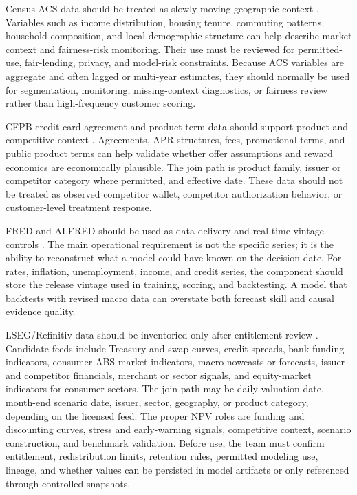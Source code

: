 \documentclass[11pt]{article}
\newcommand{\1}{\mathbf{1}}
\begin{document}
Census ACS data should be treated as slowly moving geographic context
\citep{censusACS}. Variables such as income distribution, housing tenure,
commuting patterns, household composition, and local demographic structure can
help describe market context and fairness-risk monitoring. Their use must be
reviewed for permitted-use, fair-lending, privacy, and model-risk constraints.
Because ACS variables are aggregate and often lagged or multi-year estimates,
they should normally be used for segmentation, monitoring, missing-context
diagnostics, or fairness review rather than high-frequency customer scoring.

CFPB credit-card agreement and product-term data should support product and
competitive context \citep{cfpbCreditCardData}. Agreements, APR structures,
fees, promotional terms, and public product terms can help validate whether
offer assumptions and reward economics are economically plausible. The join
path is product family, issuer or competitor category where permitted, and
effective date. These data should not be treated as observed competitor
wallet, competitor authorization behavior, or customer-level treatment
response.

FRED and ALFRED should be used as data-delivery and real-time-vintage controls
\citep{fredALFRED}. The main operational requirement is not the specific
series; it is the ability to reconstruct what a model could have known on the
decision date. For rates, inflation, unemployment, income, and credit series,
the component should store the release vintage used in training, scoring, and
backtesting. A model that backtests with revised macro data can overstate both
forecast skill and causal evidence quality.

LSEG/Refinitiv data should be inventoried only after entitlement review
\citep{lsegWorkspace,lsegEconomicData}. Candidate feeds include Treasury and
swap curves, credit spreads, bank funding indicators, consumer ABS market
indicators, macro nowcasts or forecasts, issuer and competitor financials,
merchant or sector signals, and equity-market indicators for consumer sectors.
The join path may be daily valuation date, month-end scenario date, issuer,
sector, geography, or product category, depending on the licensed feed. The
proper NPV roles are funding and discounting curves, stress and early-warning
signals, competitive context, scenario construction, and benchmark validation.
Before use, the team must confirm entitlement, redistribution limits, retention
rules, permitted modeling use, lineage, and whether values can be persisted in
model artifacts or only referenced through controlled snapshots.
\end{document}
